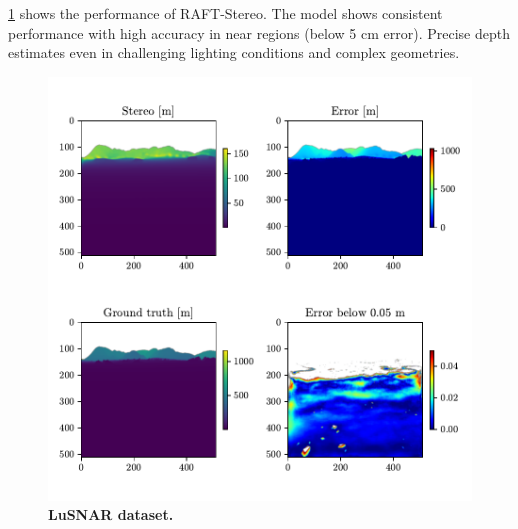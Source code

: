 \cref{fig:depth_stereo_lusnar} shows the performance of RAFT-Stereo. The model shows consistent performance with high accuracy in near regions (below 5 cm error). Precise depth estimates even in challenging lighting conditions and complex geometries.
\begin{figure}[h]
	\centering
	\includegraphics[width=\linewidth]{figures/depth_stereo_lusnar.pdf}
	\caption{\bfseries LuSNAR dataset.}
	\label{fig:depth_stereo_lusnar}
\end{figure}